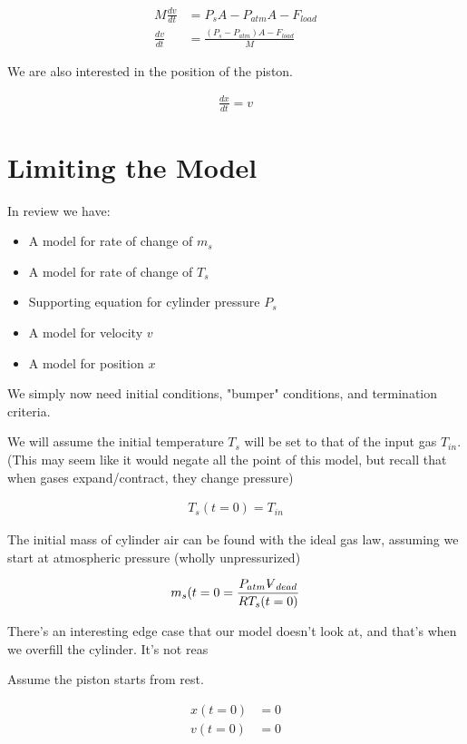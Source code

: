 \documentclass[10pt,letterpaper]{article}
\newcommand{\volume}{{\ooalign{\hfil$V$\hfil\cr\kern0.08em--\hfil\cr}}}
\begin{document}
	\begin{align}
		M \frac{dv}{dt} &= P_s A - P_{atm} A - F_{load} \nonumber \\
		\frac{dv}{dt} &= \frac{(P_s - P_{atm}) A - F_{load}}{M}
	\end{align}
	
	We are also interested in the position of the piston.
	
	\begin{align}
		\frac{dx}{dt} = v
	\end{align}
	
	\section*{Limiting the Model}
	In review we have:
	
	\begin{itemize}
		\item A model for rate of change of $m_s$
		\item A model for rate of change of $T_s$
		\item Supporting equation for cylinder pressure $P_s$
		\item A model for velocity $v$
		\item A model for position $x$
	\end{itemize}
	
	We simply now need initial conditions, "bumper" conditions, and termination criteria.
	
	We will assume the initial temperature $T_s$ will be set to that of the input gas $T_{in}$. (This may seem like it would negate all the point of this model, but recall that when gases expand/contract, they change pressure)
	
	\begin{align}
		T_s(t=0) = T_{in}
	\end{align}
	
	The initial mass of cylinder air can be found with the ideal gas law, assuming we start at atmospheric pressure (wholly unpressurized)
	
	\begin{align}
		m_s(t=0 = \frac{P_{atm} \volume_{dead}}{R T_s(t=0)}
	\end{align}
	
	There's an interesting edge case that our model doesn't look at, and that's when we overfill the cylinder. It's not reas
	
	Assume the piston starts from rest.
	
	\begin{align}
		x(t=0) &= 0 \\
		v(t=0) &= 0
	\end{align}
		
	
\end{document}
